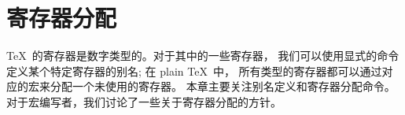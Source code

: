 \documentclass{book}
\begin{document}
\chapter{寄存器分配}\label{alloc}

\TeX\ 的寄存器是数字类型的。对于其中的一些寄存器，
我们可以使用显式的命令定义某个特定寄存器的别名;
在 plain \TeX\ 中，
所有类型的寄存器都可以通过对应的宏来分配一个未使用的寄存器。
本章主要关注别名定义和寄存器分配命令。
对于宏编写者，我们讨论了一些关于寄存器分配的方针。
\end{document}
